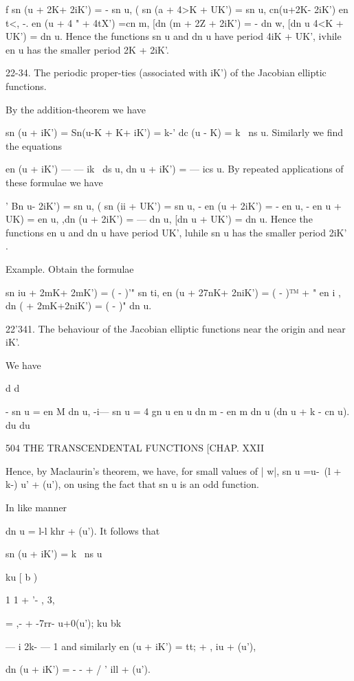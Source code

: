 f sn (u + 2K+ 2iK') = - sn u, ( sn (a + 4>K + UK') = sn u, 
 cn(u+2K- 2iK')  en t<, -. en (u + 4 " + 4tX') =cn m, 
[dn (m + 2Z + 2iK') = - dn w, [dn  u   4<K + UK') = dn u. 
Hence the functions sn u and dn u have period 4iK + UK', ivhile en u has 
the smaller period 2K + 2iK'. 

22-34. The periodic proper-ties (associated with iK') of the Jacobian 
elliptic functions. 

By the addition-theorem we have 

sn (u + iK') = Sn(u-K + K+ iK') 
= k-' dc (u - K) 
= k~  ns u. 
Similarly we find the equations 

en (u + iK') — — ik~  ds u, 
dn  u + iK') = — ics u. 
By repeated applications of these formulae we have 

' Bn u-  2iK') = sn u, ( sn (ii + UK') = sn u, 
- en (u + 2iK') = - en u, - en  u + UK) = en u, 
,dn (u + 2iK') = — dn u, [dn  u + UK') = dn u. 
Hence the functions en u and dn u have period UK', luhile sn u has the 
smaller period 2iK' . 

Example. Obtain the formulae 

sn iu + 2mK+ 2mK') = ( - )'" sn ti, 
en (u + 27nK+ 2niK') = ( - )™ + " en i , 
dn (  + 2mK+2niK') = ( - )" dn u. 

22'341. The behaviour of the Jacobian elliptic functions near the origin 
and near iK'. 

We have 

d d  

-  sn u = en M dn u, -i— sn u = 4  gn  u en u dn m - en m dn u (dn  u + k - cn  u). 
du du  



504 THE TRANSCENDENTAL FUNCTIONS [CHAP. XXII 

Hence, by Maclaurin's theorem, we have, for small values of | w|, 
sn u =u-~(l + k-) u' + (u'), 
on using the fact that sn u is an odd function. 



In like manner 



dn u = l-l khr + (u'). 
It follows that 

sn (u + iK') = k~  ns u 

ku [ b ) 

1 1 +  '-  , 3, 

= ,- + -7rr- u+0(u'); 
ku bk 

— i 2k- — 1 
and similarly en (u + iK') = tt; +  , iu + (u'), 

dn (u + iK') = - - +  / ' ill + (u'). 

